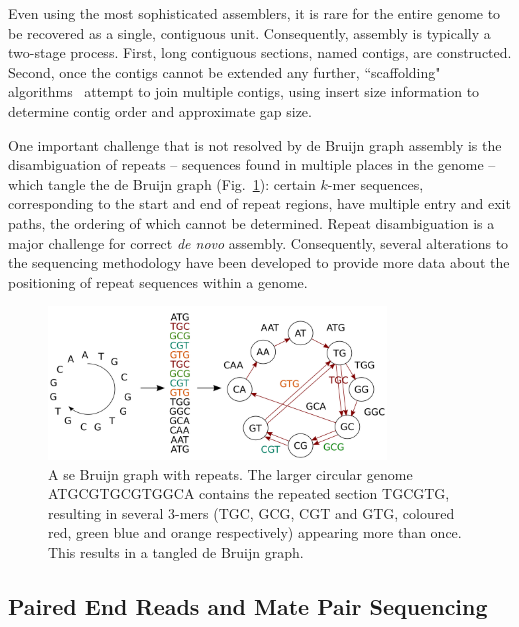 Even using the most sophisticated assemblers, it is rare for the entire genome to be recovered as a single, contiguous unit. Consequently, assembly is typically a two-stage process. First, long contiguous sections, named contigs, are constructed. Second, once the contigs cannot be extended any further, ``scaffolding" algorithms~\cite{hunt2014} attempt to join multiple contigs, using insert size information to determine contig order and approximate gap size.

One important challenge that is not resolved by de Bruijn graph assembly is the disambiguation of repeats -- sequences found in multiple places in the genome -- which tangle the de Bruijn graph (Fig.~\ref{fig:tangle}): certain $k$-mer sequences, corresponding to the start and end of repeat regions, have multiple entry and exit paths, the ordering of which cannot be determined. Repeat disambiguation is a major challenge for correct \textit{de novo} assembly. Consequently, several alterations to the sequencing methodology have been developed to provide more data about the positioning of repeat sequences within a genome. 

\begin{figure}
\centerline{\includegraphics[width=0.8\textwidth]{illumina/de_bruijn_tangle.pdf}}
\caption{A se Bruijn graph with repeats. The larger circular genome ATGCGTGCGTGGCA contains the repeated section TGCGTG, resulting in several 3-mers (TGC, GCG, CGT and GTG, coloured red, green blue and orange respectively) appearing more than once. This results in a tangled de Bruijn graph.}
\label{fig:tangle}
\end{figure}

\subsection{Paired End Reads and Mate Pair Sequencing}
